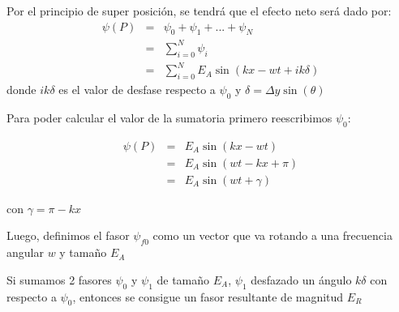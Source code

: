 \documentclass{article}
\begin{document}
        Por el principio de super posición, se tendrá que el efecto
        neto será dado por:
        \begin{eqnarray}
            \psi(P) &=& 
            \psi_0 + \psi_1 + ... + \psi_N \\
            &=& \sum_{i=0}^{N} \psi_i \\
            &=& \sum_{i=0}^{N} E_A\sin(kx - wt + ik\delta) 
        \end{eqnarray}
        donde $ik\delta$ es el valor de desfase respecto a $\psi_0$
         y $\delta = \Delta y \sin(\theta)$

        Para poder calcular el valor de la sumatoria primero 
        reescribimos $\psi_0$:

        \begin{eqnarray}
            \psi(P) &=& E_A\sin(kx-wt) \\
            &=& E_A\sin(wt - kx + \pi) \\
            &=& E_A\sin(wt+\gamma) 
        \end{eqnarray}

        con $\gamma = \pi - kx$ 
    
        Luego, definimos el fasor $\psi_{f0}$ como un vector que
        va rotando a una frecuencia angular $w$ y tamaño $E_A$

        \begin{center}
        \end{center}

        Si sumamos 2 fasores $\psi_0$ y $\psi_1$ de tamaño $E_A$, $\psi_1$ desfazado
        un ángulo $k\delta$ con respecto a  $\psi_0$, entonces se consigue un
        fasor resultante de magnitud $E_R$

        \begin{center}
        \end{center}
\end{document}
